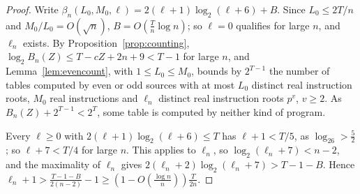 \documentclass[11pt]{article}
\theoremstyle{remark}
\begin{document}
\begin{proof}
Write $\beta_n(L_0,M_0,\ell)=2(\ell+1)\log_2(\ell+6)+B$.  Since $L_0\le2T/n$ and
$M_0/L_0=O(\sqrt n)$, $B=O(\frac Tn\log n)$; so $\ell=0$ qualifies for large $n$, and
$\ell_n$ exists.  By Proposition~\ref{prop:counting}, $\log_2B_n(Z)\le T-cZ+2n+9<T-1$
for large $n$, and Lemma~\ref{lem:evencount}, with $1\le L_0\le M_0$, bounds by $2^{T-1}$
the number of tables computed by even or odd sources with at most $L_0$ distinct real
instruction roots, $M_0$ real instructions and $\ell_n$ distinct real instruction roots
$p^v$, $v\ge2$.  As $B_n(Z)+2^{T-1}<2^T$, some table is computed by neither kind of
program.

Every $\ell\ge0$ with $2(\ell+1)\log_2(\ell+6)\le T$ has $\ell+1<T/5$, as $\log_26>\frac52$;
so $\ell+7<T/4$ for large $n$.  This applies to $\ell_n$, so $\log_2(\ell_n+7)<n-2$, and the
maximality of $\ell_n$ gives $2(\ell_n+2)\log_2(\ell_n+7)>T-1-B$.  Hence
$\ell_n+1>\frac{T-1-B}{2(n-2)}-1\ge(1-O(\frac{\log n}n))\frac T{2n}$.
\end{proof}
\end{document}
